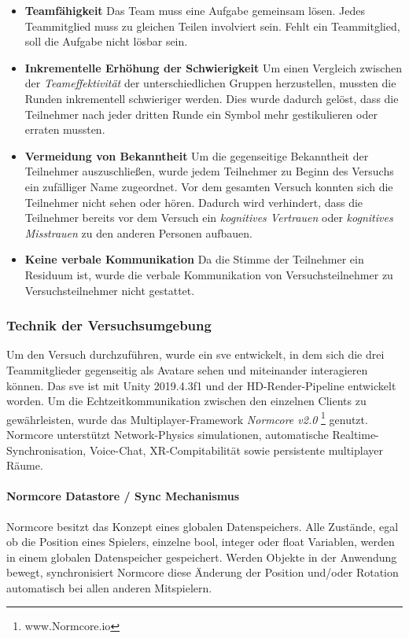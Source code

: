 \documentclass[a4paper,11pt]{article}%
\renewcommand{\\}{\vspace*{0.5\baselineskip} \newline}
\begin{document}
{\begin{itemize}
\item \textbf{Teamfähigkeit} Das Team muss eine Aufgabe gemeinsam lösen. Jedes Teammitglied muss zu gleichen Teilen involviert sein. Fehlt ein Teammitglied, soll die Aufgabe nicht lösbar sein.
\item \textbf{Inkrementelle Erhöhung der Schwierigkeit} Um einen Vergleich zwischen der \textit{Teameffektivität} der unterschiedlichen Gruppen herzustellen, mussten die Runden inkrementell schwieriger werden. Dies wurde dadurch gelöst, dass die Teilnehmer nach jeder dritten Runde ein Symbol mehr gestikulieren oder erraten mussten.
\item \textbf{Vermeidung von Bekanntheit} Um die gegenseitige Bekanntheit der Teilnehmer auszuschließen, wurde jedem Teilnehmer zu Beginn des Versuchs ein zufälliger Name zugeordnet. Vor dem gesamten Versuch konnten sich die Teilnehmer nicht sehen oder hören.
Dadurch wird verhindert, dass die Teilnehmer bereits vor dem Versuch ein \textit{kognitives Vertrauen} oder \textit{kognitives Misstrauen} zu den anderen Personen aufbauen.
\item \textbf{Keine verbale Kommunikation} Da die Stimme der Teilnehmer ein Residuum ist, wurde die verbale Kommunikation von Versuchsteilnehmer zu Versuchsteilnehmer nicht gestattet. 
\end{itemize}

\subsubsection{Technik der Versuchsumgebung}
Um den Versuch durchzuführen, wurde ein \ac{sve} entwickelt, in dem sich die drei Teammitglieder gegenseitig als Avatare sehen und miteinander interagieren können. Das \ac{sve} ist mit Unity 2019.4.3f1 und der HD-Render-Pipeline entwickelt worden. Um die Echtzeitkommunikation zwischen den einzelnen Clients zu gewährleisten, wurde das Multiplayer-Framework \textit{Normcore v2.0} \footnote{www.Normcore.io} genutzt.
Normcore unterstützt Network-Physics simulationen, automatische Realtime- Synchronisation, Voice-Chat, XR-Compitabilität sowie persistente multiplayer Räume.	

\paragraph{Normcore Datastore / Sync Mechanismus}
Normcore besitzt das Konzept eines globalen Datenspeichers.  Alle Zustände, egal ob die Position eines Spielers, einzelne bool, integer oder float Variablen, werden in einem globalen Datenspeicher gespeichert. Werden Objekte in der Anwendung bewegt, synchronisiert Normcore diese Änderung der Position und/oder Rotation automatisch bei allen anderen Mitspielern.

}
\end{document}
